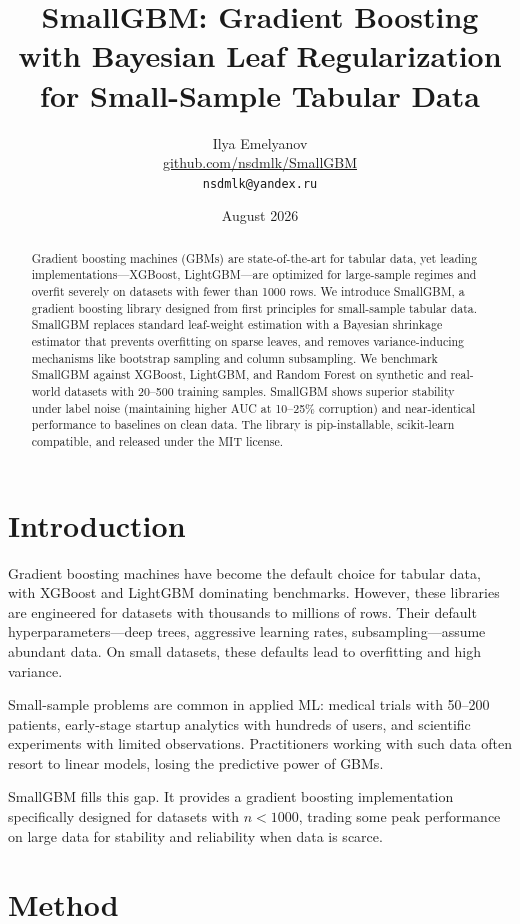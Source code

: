 \documentclass{article}
\title{SmallGBM: Gradient Boosting with Bayesian Leaf Regularization\\ for Small-Sample Tabular Data}
\author{Ilya Emelyanov\\
\href{https://github.com/nsdmlk/SmallGBM}{github.com/nsdmlk/SmallGBM}\\
\texttt{nsdmlk@yandex.ru}}
\date{August 2026}
\begin{document}
\maketitle

\begin{abstract}
Gradient boosting machines (GBMs) are state-of-the-art for tabular data, yet leading implementations---XGBoost, LightGBM---are optimized for large-sample regimes and overfit severely on datasets with fewer than 1000 rows. We introduce SmallGBM, a gradient boosting library designed from first principles for small-sample tabular data. SmallGBM replaces standard leaf-weight estimation with a Bayesian shrinkage estimator that prevents overfitting on sparse leaves, and removes variance-inducing mechanisms like bootstrap sampling and column subsampling. We benchmark SmallGBM against XGBoost, LightGBM, and Random Forest on synthetic and real-world datasets with 20--500 training samples. SmallGBM shows superior stability under label noise (maintaining higher AUC at 10--25\% corruption) and near-identical performance to baselines on clean data. The library is pip-installable, scikit-learn compatible, and released under the MIT license.
\end{abstract}

\section{Introduction}
Gradient boosting machines \cite{friedman2001greedy} have become the default choice for tabular data, with XGBoost \cite{chen2016xgboost} and LightGBM \cite{ke2017lightgbm} dominating benchmarks. However, these libraries are engineered for datasets with thousands to millions of rows. Their default hyperparameters---deep trees, aggressive learning rates, subsampling---assume abundant data. On small datasets, these defaults lead to overfitting and high variance.

Small-sample problems are common in applied ML: medical trials with 50--200 patients, early-stage startup analytics with hundreds of users, and scientific experiments with limited observations. Practitioners working with such data often resort to linear models, losing the predictive power of GBMs.

SmallGBM fills this gap. It provides a gradient boosting implementation specifically designed for datasets with $n < 1000$, trading some peak performance on large data for stability and reliability when data is scarce.

\section{Method}
\label{sec:method}
\end{document}
